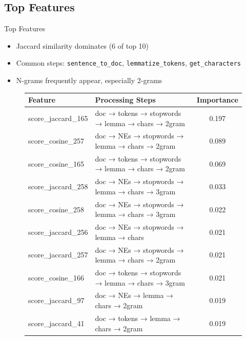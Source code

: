 \documentclass{beamer}
\begin{document}
\subsection{Top Features}
\begin{frame}{Top Features}
    \begin{itemize}
        \item Jaccard similarity dominates (6 of top 10)
        \item Common steps: \texttt{sentence\_to\_doc}, \texttt{lemmatize\_tokens}, \texttt{get\_characters}
        \item N-grams frequently appear, especially 2-grams
    \end{itemize}
    \begin{figure}[h]
        \centering
        \begin{tabular}{|l|l|c|}
            \hline
            \tiny{\textbf{Feature}} & \tiny{\textbf{Processing Steps}} & \tiny{\textbf{Importance}} \\
            \hline
            \tiny{score\_jaccard\_165} & \tiny{doc → tokens → stopwords → lemma → chars → 2gram} & \tiny{0.197} \\
            \tiny{score\_cosine\_257} & \tiny{doc → NEs → stopwords → lemma → chars → 2gram} & \tiny{0.089} \\
            \tiny{score\_cosine\_165} & \tiny{doc → tokens → stopwords → lemma → chars → 2gram} & \tiny{0.069} \\
            \tiny{score\_jaccard\_258} & \tiny{doc → NEs → stopwords → lemma → chars → 3gram} & \tiny{0.033} \\
            \tiny{score\_cosine\_258} & \tiny{doc → NEs → stopwords → lemma → chars → 3gram} & \tiny{0.022} \\
            \tiny{score\_jaccard\_256} & \tiny{doc → NEs → stopwords → lemma → chars} & \tiny{0.021} \\
            \tiny{score\_jaccard\_257} & \tiny{doc → NEs → stopwords → lemma → chars → 2gram} & \tiny{0.021} \\
            \tiny{score\_cosine\_166} & \tiny{doc → tokens → stopwords → lemma → chars → 3gram} & \tiny{0.021} \\
            \tiny{score\_jaccard\_97} & \tiny{doc → NEs → lemma → chars → 2gram} & \tiny{0.019} \\
            \tiny{score\_jaccard\_41} & \tiny{doc → tokens → lemma → chars → 2gram} & \tiny{0.019} \\
            \hline
        \end{tabular}
    \end{figure}
\end{frame}
\end{document}
